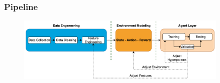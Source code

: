 %
%




\begin{frame}
    \frametitle{Pipeline}
    \begin{center}
        \begin{figure}
            \centering
            \includegraphics[width=0.9\textwidth]{img/navrh_reseni}
        \end{figure}
    \end{center}
\end{frame}

